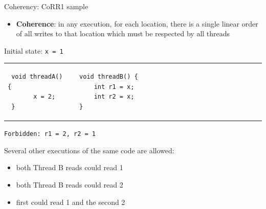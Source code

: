 \begin{frame}[t,fragile]{Coherency: CoRR1 sample}

\begin{itemize}
    \item \textbf{Coherence}: in any execution, for each location, there is a single linear order of all writes to that location which must be respected by all threads
\end{itemize}

\pause

Initial state: \texttt{x = 1}
\begin{tabular}{p{} p{}} 
 \begin{verbatim}
 void threadA() {
       x = 2;   
 }
 \end{verbatim}
 &  
 \begin{verbatim}
 void threadB() {                                   
     int r1 = x;                           
     int r2 = x;                           
 }                    
 \end{verbatim}
\end{tabular}

\pause
\texttt{Forbidden: r1 = 2, r2 = 1}

\pause
Several other executions of the same code are allowed: 
\begin{itemize}
    \item both Thread B reads could read 1
    \item both Thread B reads could read 2
    \item first could read 1 and the second 2
\end{itemize}

\end{frame}


